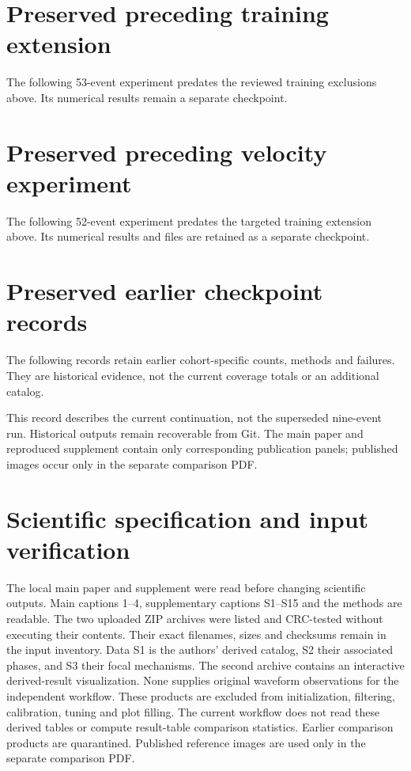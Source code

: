 

\section*{Preserved preceding training extension}
The following 53-event experiment predates the reviewed training exclusions above.
Its numerical results remain a separate checkpoint.


\section*{Preserved preceding velocity experiment}
The following 52-event experiment predates the targeted training extension above.
Its numerical results and files are retained as a separate checkpoint.






\section*{Preserved earlier checkpoint records}
The following records retain earlier cohort-specific counts, methods and failures. They are historical evidence, not the current coverage totals or an additional catalog.

This record describes the current continuation, not the superseded nine-event run. Historical outputs remain recoverable from Git. The main paper and reproduced supplement contain only corresponding publication panels; published images occur only in the separate comparison PDF.



\section{Scientific specification and input verification}
The local main paper and supplement were read before changing scientific outputs. Main captions 1--4, supplementary captions S1--S15 and the methods are readable. The two uploaded ZIP archives were listed and CRC-tested without executing their contents. Their exact filenames, sizes and checksums remain in the input inventory.
\begingroup\small\endgroup
Data S1 is the authors' derived catalog, S2 their associated phases, and S3 their focal mechanisms. The second archive contains an interactive derived-result visualization. None supplies original waveform observations for the independent workflow. These products are excluded from initialization, filtering, calibration, tuning and plot filling. The current workflow does not read these derived tables or compute result-table comparison statistics. Earlier comparison products are quarantined. Published reference images are used only in the separate comparison PDF.


